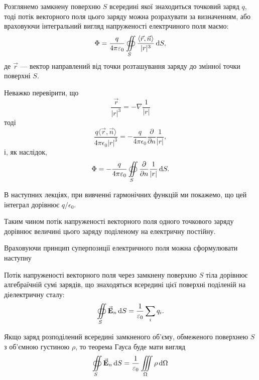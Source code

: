 Розглянемо замкнену поверхню $S$ всередині якої знаходиться точковий заряд $q$, тоді потік векторного поля цього заряду можна розрахувати за визначенням, або враховуючи інтегральний вигляд напруженості електрчиного поля маємо:
\begin{equation}
	\Phi = \frac{q}{4 \pi\epsilon_0} \Oiint_S \frac{\langle \vec r, \vec n\rangle}{|r|^3} \diff S,
\end{equation}
де $\vec r$ --- вектор направлений від точки розташування заряду до змінної точки поверхні $S$. \medskip

Неважко перевірити, що
\begin{equation}
	\frac{\vec r}{|r|^3} = - \nabla \frac{1}{|r|}
\end{equation}
тоді
\begin{equation}
	\frac{q\langle \vec r,\vec n\rangle}{4 \pi \epsilon_0 |r|^3} = - \frac{q}{4 \pi \epsilon_0} \frac{\partial}{\partial n} \frac{1}{|r|},
\end{equation}
і, як наслідок,
\begin{equation}
	\Phi = - \frac{q}{4 \pi \varepsilon_0} \displaystyle\oiint\limits_S \frac{\partial}{\partial n} \frac{1}{|r|} \mathop{}\!\mathrm{d} S.
\end{equation}

В наступних лекціях, при вивченні гармонічних функцій ми покажемо, що цей інтеграл дорівнює $q / \epsilon_0$. \medskip

Таким чином потік напруженості векторного поля одного точкового заряду дорівнює величині цього заряду поділеному на електричну постійну. \medskip

Враховуючи принцип суперпозиції електричного поля можна сформулювати наступну
\begin{theorem}
	Потік напруженості векторного поля через замкнену поверхню $S$ тіла дорівнює алгебраїчній сумі зарядів, що знаходяться всередині цієї поверхні поділеній на діелектричну сталу:
	\begin{equation}
		\displaystyle\oiint\limits_S {\vec{\mathbf{E}}}_n \mathop{}\!\mathrm{d} S = \frac{1}{\varepsilon_0} \displaystyle\sum\limits_i q_i.
	\end{equation}
\end{theorem}

Якщо заряд розподілений всередині замкненого об'єму, обмеженого поверхнею $S$ з об'ємною густиною $\rho$, то теорема Гауса буде мати вигляд
\begin{equation}
	\displaystyle\oiint\limits_S {\vec{\mathbf{E}}}_n \mathop{}\!\mathrm{d} S = \frac{1}{\varepsilon_0} \displaystyle\iiint\limits_\Omega \rho \mathop{}\!\mathrm{d} \Omega
\end{equation}

